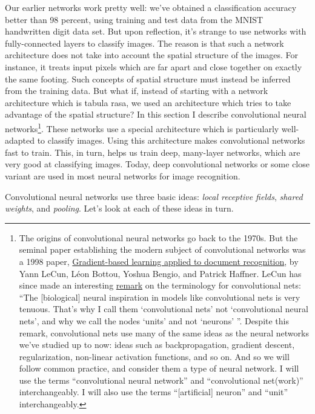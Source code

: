\documentclass[a4paper,twoside,10pt]{book}
\begin{document}
Our earlier networks work pretty well: we've obtained a classification accuracy better than 98 percent, using training and test data from the MNIST handwritten digit data set. But upon reflection, it's strange to use networks with fully-connected layers to classify images. The reason is that such a network architecture does not take into account the spatial structure of the images. For instance, it treats input pixels which are far apart and close together on exactly the same footing. Such concepts of spatial structure must instead be inferred from the training data. But what if, instead of starting with a network architecture which is tabula rasa, we used an architecture which tries to take advantage of the spatial structure? In this section I describe convolutional neural networks\footnote{The origins of convolutional neural networks go back to the 1970s. But the seminal paper establishing the modern subject of convolutional networks was a 1998 paper, \href{http://yann.lecun.com/exdb/publis/pdf/lecun-98.pdf}{Gradient-based learning applied to document recognition}, by Yann LeCun, L\'eon Bottou, Yoshua Bengio, and Patrick Haffner. LeCun has since made an interesting \href{https://www.facebook.com/yann.lecun/posts/10152348155137143}{remark} on the terminology for convolutional nets: ``The [biological] neural inspiration in models like convolutional nets is very tenuous. That's why I call them `convolutional nets' not `convolutional neural nets', and why we call the nodes `units' and not `neurons' ''. Despite this remark, convolutional nets use many of the same ideas as the neural networks we've studied up to now: ideas such as backpropagation, gradient descent, regularization, non-linear activation functions, and so on. And so we will follow common practice, and consider them a type of neural network. I will use the terms ``convolutional neural network'' and ``convolutional net(work)'' interchangeably. I will also use the terms ``[artificial] neuron'' and ``unit'' interchangeably.}. These networks use a special architecture which is particularly well-adapted to classify images. Using this architecture makes convolutional networks fast to train. This, in turn, helps us train deep, many-layer networks, which are very good at classifying images. Today, deep convolutional networks or some close variant are used in most neural networks for image recognition.

Convolutional neural networks use three basic ideas: \textit{local receptive fields}, \textit{shared weights}, and \textit{pooling}. Let's look at each of these ideas in turn.
\end{document}
